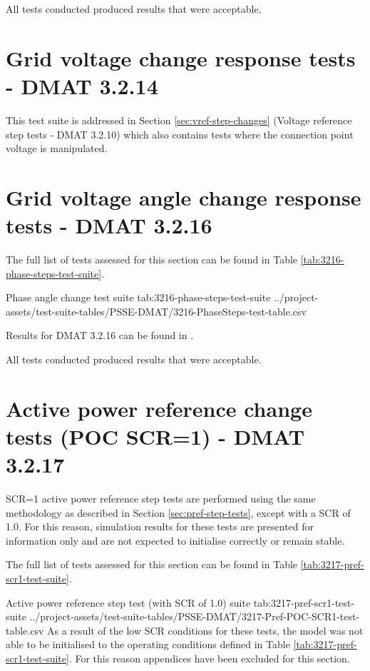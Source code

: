 \documentclass{../grid-link-report}
\newcommand{\projectassetsdir}{../project-assets}
\begin{document}
	All tests conducted produced results that were acceptable.
	
	
	\section{Grid voltage change response tests - DMAT 3.2.14}		
	
	
	This test suite is addressed in Section \ref{sec:vref-step-changes} (Voltage reference step tests - DMAT 3.2.10) which also contains tests where the connection point voltage is manipulated.
	
	\section{Grid voltage angle change response tests - DMAT 3.2.16}		
	
	
	
	The full list of tests assessed for this section can be found in Table \ref{tab:3216-phase-steps-test-suite}.
	
	{
		\fontsize{7}{9}\selectfont
		\autoscaledlongtable
		{Phase angle change test suite}
		{tab:3216-phase-steps-test-suite}
		{\projectassetsdir/test-suite-tables/PSSE-DMAT/3216-PhaseSteps-test-table.csv}
	}
	
	Results for DMAT 3.2.16 can be found in .
	
	All tests conducted produced results that were acceptable.
	
	
	\section{Active power reference change tests (POC SCR=1) - DMAT 3.2.17}		
	
	SCR=1 active power reference step tests are performed using the same methodology as described in Section \ref{sec:pref-step-tests}, except with a \ac{SCR} of 1.0. For this reason, simulation results for these tests are presented for information only and are not expected to initialise correctly or remain stable. 
	
	The full list of tests assessed for this section can be found in Table \ref{tab:3217-pref-scr1-test-suite}.
	
	{
		\fontsize{7}{9}\selectfont
		\autoscaledlongtable
		{Active power reference step test (with SCR of 1.0) suite}
		{tab:3217-pref-scr1-test-suite}
		{\projectassetsdir/test-suite-tables/PSSE-DMAT/3217-Pref-POC-SCR1-test-table.csv}
	}
	As a result of the low SCR conditions for these tests, the model was not able to be initialised to the operating conditions defined in Table \ref{tab:3217-pref-scr1-test-suite}. For this reason appendices have been excluded for this section.
\end{document}
